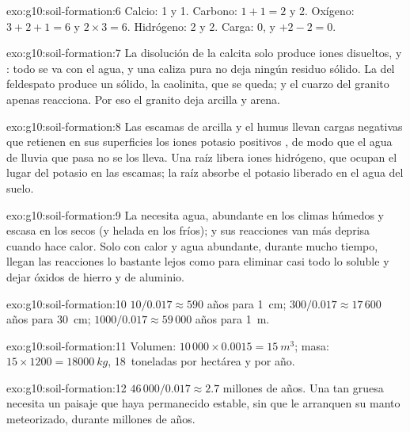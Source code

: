 \begin{solution}{exo:g10:soil-formation:6}
Calcio: 1 y 1. Carbono: $1 + 1 = 2$ y 2. Oxígeno: $3 + 2 + 1 = 6$ y
$2 \times 3 = 6$. Hidrógeno: 2 y 2. Carga: 0, y $+2 - 2 = 0$.
\end{solution}

\begin{solution}{exo:g10:soil-formation:7}
La disolución de la calcita solo produce iones disueltos,  y
: todo se va con el agua, y una caliza pura no deja ningún residuo
sólido. La  del feldespato produce un sólido, la caolinita, que se
queda; y el cuarzo del granito apenas reacciona. Por eso el granito deja
arcilla y arena.
\end{solution}

\begin{solution}{exo:g10:soil-formation:8}
Las escamas de arcilla y el humus llevan cargas negativas que retienen en sus
superficies los iones potasio positivos , de modo que el agua de
lluvia que pasa no se los lleva. Una raíz libera iones hidrógeno, que ocupan
el lugar del potasio en las escamas; la raíz absorbe el potasio liberado en
el agua del suelo.
\end{solution}

\begin{solution}{exo:g10:soil-formation:9}
La  necesita agua, abundante en los climas húmedos y
escasa en los secos (y helada en los fríos); y sus reacciones van más deprisa
cuando hace calor. Solo con calor y agua abundante, durante mucho tiempo,
llegan las reacciones lo bastante lejos como para eliminar casi todo lo
soluble y dejar óxidos de hierro y de aluminio.
\end{solution}

\begin{solution}{exo:g10:soil-formation:10}
$10/0.017 \approx 590$ años para \qty{1}{cm}; $300/0.017 \approx 17\,600$
años para \qty{30}{cm}; $1000/0.017 \approx 59\,000$ años para \qty{1}{m}.
\end{solution}

\begin{solution}{exo:g10:soil-formation:11}
Volumen: $10\,000 \times 0.0015 = \qty{15}{m^3}$; masa: $15 \times 1200 =
\qty{18000}{kg}$, \num{18}~toneladas por hectárea y por año.
\end{solution}

\begin{solution}{exo:g10:soil-formation:12}
$46\,000/0.017 \approx 2.7$ millones de años. Una  tan gruesa
necesita un paisaje que haya permanecido estable, sin que le arranquen su
manto meteorizado, durante millones de años.
\end{solution}

